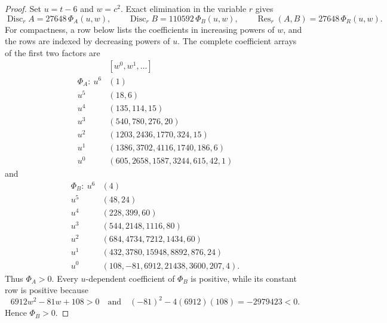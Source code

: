\documentclass[11pt]{article}
\theoremstyle{definition}
\theoremstyle{remark}
\begin{document}
\begin{proof}
Set \(u=t-6\) and \(w=c^2\).  Exact elimination in the variable \(r\)
gives
\[
 \operatorname{Disc}_r A=27648\,\Phi_A(u,w),\qquad
 \operatorname{Disc}_r B=110592\,\Phi_B(u,w),\qquad
 \operatorname{Res}_r(A,B)=27648\,\Phi_R(u,w).
 \tag{N4.4}
\]
For compactness, a row below lists the coefficients in increasing powers of
\(w\), and the rows are indexed by decreasing powers of \(u\).  The complete
coefficient arrays of the first two factors are
\[
\begin{array}{c|l}
 & [w^0,w^1,\ldots]\\ \hline
\Phi_A:\ u^6&(1)\\
u^5&(18,6)\\
u^4&(135,114,15)\\
u^3&(540,780,276,20)\\
u^2&(1203,2436,1770,324,15)\\
u^1&(1386,3702,4116,1740,186,6)\\
u^0&(605,2658,1587,3244,615,42,1)
\end{array}
\tag{N4.5}
\]
and
\[
\begin{array}{c|l}
\Phi_B:\ u^6&(4)\\
u^5&(48,24)\\
u^4&(228,399,60)\\
u^3&(544,2148,1116,80)\\
u^2&(684,4734,7212,1434,60)\\
u^1&(432,3780,15948,8892,876,24)\\
u^0&(108,-81,6912,21438,3600,207,4).
\end{array}
\tag{N4.6}
\]
Thus \(\Phi_A>0\).  Every \(u\)-dependent coefficient of \(\Phi_B\) is
positive, while its constant row is positive because
\[
 6912w^2-81w+108>0
 \quad\text{and}\quad
 (-81)^2-4(6912)(108)=-2979423<0.
 \tag{N4.7}
\]
Hence \(\Phi_B>0\).


\end{proof}
\end{document}
